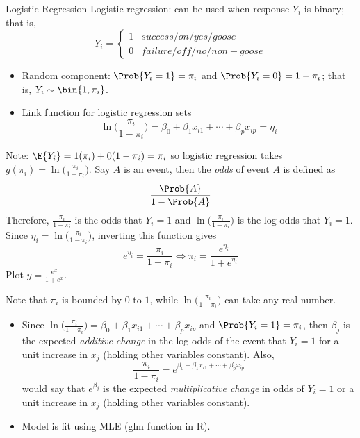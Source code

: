 \begin{Example}{Logistic Regression}{}
    Logistic regression: can be used when response $ Y_i $ is
    binary; that is,
    \[ Y_i =\begin{cases*}
            1 & success/on/yes/goose\\
            0 & failure/off/no/non-goose
        \end{cases*} \]
    \begin{itemize}
        \item Random component: $ \Prob{Y_i=1}=\pi_i $ and
              $ \Prob{Y_i=0}=1-\pi_i $; that is,
              $ Y_i \sim \bin{1,\pi_i} $.
        \item Link function for logistic regression sets
              \[ \ln\biggl(\frac{\pi_i}{1-\pi_i} \biggr)=
                  \beta_0+\beta_1x_{i1}+\cdots+\beta_p x_{i p}=\eta_i \]
    \end{itemize}
    Note: $ \E{Y_i}=1(\pi_i)+0(1-\pi_i)=\pi_i $ so logistic regression
    takes $ \displaystyle g(\pi_i)=\ln\biggl(\frac{\pi_i}{1-\pi_i}\biggr) $.
    Say $ A $ is an event, then the \emph{odds} of event $ A $ is defined as
    \[ \frac{\Prob{A}}{1-\Prob{A}} \]
    Therefore, $ \displaystyle \frac{\pi_i}{1-\pi_i} $ is the odds that
    $ Y_i=1 $ and $ \displaystyle \ln\biggl(\frac{\pi_i}{1-\pi_i}\biggr) $
    is the log-odds that $ Y_i=1 $. Since
    $ \displaystyle \eta_i=\ln\biggl(\frac{\pi_i}{1-\pi_i}\biggr) $,
    inverting this function gives
    \[ e^{\eta_i}=\frac{\pi_i}{1-\pi_i}\iff \pi_i=\frac{e^{\eta_i}}{1+e^{\eta_i}} \]
    Plot $ \displaystyle y=\frac{e^x}{1+e^x} $.

    Note that $ \pi_i $ is bounded by $ 0 $ to $ 1 $, while
    $ \displaystyle \ln\biggl(\frac{\pi_i}{1-\pi_i}\biggr) $
    can take any real number.
    \begin{itemize}
        \item Since $ \displaystyle \ln\biggl(\frac{\pi_i}{1-\pi_i}\biggr)=
                  \beta_0+\beta_1x_{i1}+\cdots+\beta_p x_{i p} $
              and $ \Prob{Y_i=1}=\pi_i $, then $ \beta_j $ is
              the expected \emph{additive change} in the log-odds of the event that $ Y_i=1 $
              for a unit increase in $ x_j $ (holding other variables constant).
              Also,
              \[ \frac{\pi_i}{1-\pi_i}=e^{\beta_0+\beta_1x_{i1}+\cdots+\beta_p x_{i p}}  \]
              would say that $ e^{\beta_j} $ is the expected \emph{multiplicative change}
              in odds of $ Y_i=1 $ or a unit increase in $ x_j $ (holding other variables constant).
        \item Model is fit using MLE (glm function in R).
    \end{itemize}
\end{Example}
